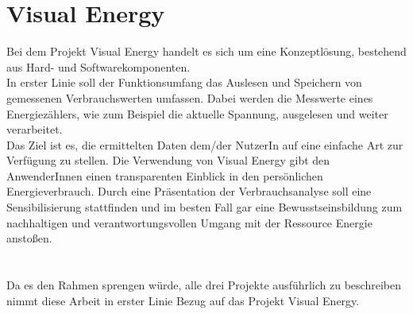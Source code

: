 \documentclass[Bachelorarbeit.tex]{subfiles}
\begin{document}
\section*{Visual Energy}
Bei dem Projekt Visual Energy handelt es sich um eine Konzeptlösung, bestehend aus Hard- und Softwarekomponenten.\\
In erster Linie soll der Funktionsumfang das Auslesen und Speichern von gemessenen Verbrauchswerten umfassen.
Dabei werden die Messwerte eines Energiezählers, wie zum Beispiel die aktuelle Spannung, ausgelesen und weiter verarbeitet.\\
Das Ziel ist es, die ermittelten Daten dem/der NutzerIn auf eine einfache Art zur Verfügung zu stellen.
Die Verwendung von Visual Energy gibt den AnwenderInnen einen transparenten Einblick in den persönlichen Energieverbrauch. 
Durch eine Präsentation der Verbrauchsanalyse soll eine Sensibilisierung stattfinden und im besten Fall gar eine Bewusstseinsbildung zum nachhaltigen und verantwortungsvollen Umgang mit der Ressource Energie anstoßen.\\
\\\\
Da es den Rahmen sprengen würde, alle drei Projekte ausführlich zu beschreiben nimmt diese Arbeit in erster Linie Bezug auf das Projekt Visual Energy.
%
%
 
\end{document}
